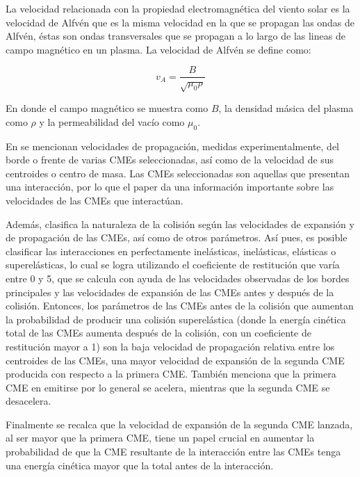 La velocidad relacionada con la propiedad electromagnética del viento solar es la velocidad de Alfvén que es la misma velocidad en la que se propagan las ondas de Alfvén, éstas son ondas transversales que se propagan a lo largo de las lineas de campo magnético en un plasma. La velocidad de Alfvén se define como:

\begin{equation}
    v_A=\frac{B}{\sqrt{\mu_0 \rho}}
    \label{Valfvenica}
\end{equation}

En donde el campo magnético se muestra como $B$, la densidad másica del plasma como $\rho$ y la permeabilidad del vacío como $\mu_0$.


En \cite{mishra-2017} se mencionan velocidades de propagación, medidas experimentalmente, del borde o frente de varias \acp{CME} seleccionadas, así como de la velocidad de sus centroides o centro de masa. Las \acp{CME} seleccionadas son aquellas que presentan una interacción, por lo que el paper da una información importante sobre las velocidades de las \acp{CME} que interactúan. 

Además, clasifica la naturaleza de la colisión según las velocidades de expansión y de propagación de las CMEs, así como de otros parámetros. Así pues, es posible clasificar las interacciones en perfectamente inelásticas, inelásticas, elásticas o superelásticas, lo cual se logra utilizando el coeficiente de restitución que varía entre 0 y 5, que se calcula con ayuda de las velocidades observadas de los bordes principales y las velocidades de expansión de las \acp{CME} antes y después de la colisión. Entonces, los parámetros de las \acp{CME} antes de la colisión que aumentan la probabilidad de producir una colisión superelástica (donde la energía cinética total de las \acp{CME} aumenta después de la colisión, con un coeficiente de restitución mayor a 1) son la baja velocidad de propagación relativa entre los centroides de las CMEs, una mayor velocidad de expansión de la segunda \ac{CME} producida con respecto a la primera CME. También menciona que la primera \ac{CME} en emitirse por lo general se acelera, mientras que la segunda \ac{CME} se desacelera.

Finalmente se recalca que la velocidad de expansión de la segunda \ac{CME} lanzada, al ser mayor que la primera CME, tiene un papel crucial en aumentar la probabilidad de que la \ac{CME} resultante de la interacción entre las \acp{CME} tenga una energía cinética mayor que la total antes de la interacción.


